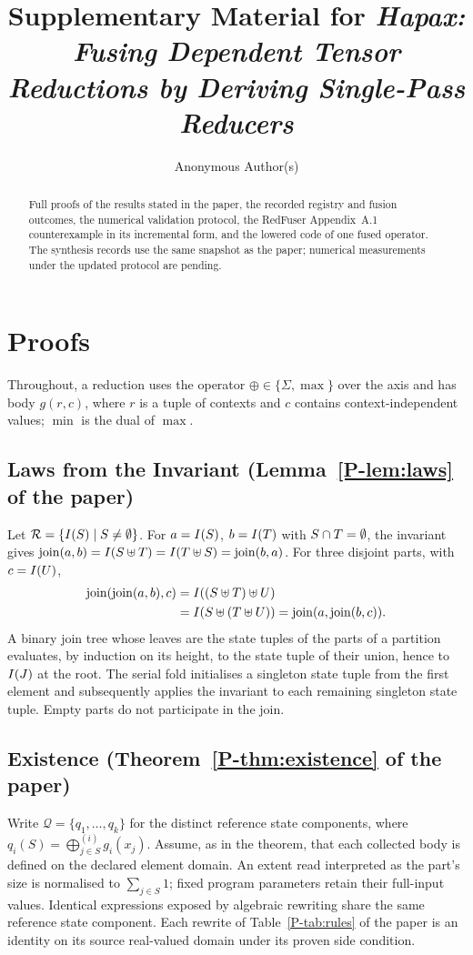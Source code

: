 \documentclass[acmsmall,screen,review,anonymous,nonacm]{acmart}
\newcommand{\pref}[1]{\ref{P-#1} of the paper}
\begin{document}
\title{Supplementary Material for \emph{Hapax: Fusing Dependent Tensor Reductions by Deriving Single-Pass Reducers}}
\author{Anonymous Author(s)}
\begin{abstract}
Full proofs of the results stated in the paper, the recorded registry and fusion outcomes, the numerical validation protocol, the RedFuser Appendix~A.1 counterexample in its incremental form, and the lowered code of one fused operator.
The synthesis records use the same snapshot as the paper; numerical measurements under the updated protocol are pending.
\end{abstract}
\maketitle

\section{Proofs}
\label{app:proofs}

Throughout, a reduction uses the operator $\oplus\in\{\Sigma,\max\}$ over the axis and has body $g(r,c)$, where $r$ is a tuple of contexts and $c$ contains context-independent values; $\min$ is the dual of $\max$.

\subsection{Laws from the Invariant (Lemma~\pref{lem:laws})}
Let $\mathcal{R}=\{I(S)\mid S\neq\emptyset\}$.
For $a=I(S)$, $b=I(T)$ with $S\cap T=\emptyset$, the invariant gives $\operatorname{join}(a,b)=I(S\uplus T)=I(T\uplus S)=\operatorname{join}(b,a)$.
For three disjoint parts, with $c=I(U)$,
\[
\begin{aligned}
\operatorname{join}(\operatorname{join}(a,b),c)
  &=I((S\uplus T)\uplus U)\\
  &=I(S\uplus(T\uplus U))
   =\operatorname{join}(a,\operatorname{join}(b,c)).
\end{aligned}
\]
A binary join tree whose leaves are the state tuples of the parts of a partition evaluates, by induction on its height, to the state tuple of their union, hence to $I(J)$ at the root.
The serial fold initialises a singleton state tuple from the first element and subsequently applies the invariant to each remaining singleton state tuple.
Empty parts do not participate in the join.

\subsection{Existence (Theorem~\pref{thm:existence})}
Write $\mathcal Q=\{q_1,\dots,q_k\}$ for the distinct reference state components, where $q_i(S)=\bigoplus_{j\in S}^{(i)}g_i(x_j)$.
Assume, as in the theorem, that each collected body is defined on the declared element domain.
An extent read interpreted as the part's size is normalised to $\sum_{j\in S}1$; fixed program parameters retain their full-input values.
Identical expressions exposed by algebraic rewriting share the same reference state component.
Each rewrite of Table~\pref{tab:rules} is an identity on its source real-valued domain under its proven side condition.
\end{document}
